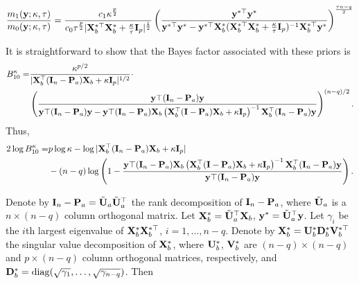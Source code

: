 \documentclass[11pt]{article}
\DeclareMathOperator{\mydiag}{diag}
\newcommand{\By}{\mathbf{y}}    \newcommand{\Bz}{\mathbf{z}}
\theoremstyle{plain}
\theoremstyle{definition}
\theoremstyle{remark}
\begin{document}
\begin{equation*}
    \begin{split}
        \frac{m_1(\By;\kappa,\tau)}{m_0(\By;\kappa,\tau)} 
        =
        \frac{c_1 \kappa^{\frac{p}{2}}}{c_0 \tau^{\frac p 2}
        |\BX_b^{*\top} \BX_b^* + \frac{\kappa}{\tau } \BI_p|^{\frac 1 2}
        }
        \left(
            \frac{\By^{*\top} \By^*}{
\By^{*\top} \By^* - \By^{*\top} \BX_b^* ( \BX_b^{*\top}\BX_b^* + \frac{\kappa}{\tau} \BI_p )^{-1} \BX_b^{*\top} \By^*
            }
        \right)^{\frac{\tau n - q }{2}}
    \end{split}
\end{equation*}


It is straightforward to show that the Bayes factor associated with these priors is
\begin{equation*}
    \begin{split}
        B_{10}^{\kappa}=  &
    \frac{\kappa^{p/2}}{
        |\BX_b^\top (\BI_n -\BP_a) \BX_b + \kappa \BI_p |^{1/2}
    }
    \cdot
    \\
    &
    \left(
        \frac{
            \By\top (\BI_n-\BP_a) \By
        }{
            \By\top (\BI_n-\BP_a) \By
            -
            \By\top (\BI_n-\BP_a) \BX_b
            \left(\BX_b^\top  (\BI-\BP_a) \BX_b + \kappa \BI_p\right)^{-1}
            \BX_b^\top (\BI_n-\BP_a) \By
        }
    \right)^{(n-q)/2}.
    \end{split}
\end{equation*}
Thus,
\begin{equation*}
    \begin{split}
        2\log B_{10}^{\kappa} =  &
    p\log \kappa
    -
        \log |\BX_b^\top (\BI_n -\BP_a) \BX_b + \kappa \BI_p |
    \\
    &
    -(n-q)\log \left(
            1-
        \frac{
            \By\top (\BI_n-\BP_a) \BX_b
            \left(\BX_b^\top  (\BI-\BP_a) \BX_b + \kappa \BI_p\right)^{-1}
            \BX_b^\top (\BI_n-\BP_a) \By
        }{
            \By\top (\BI_n-\BP_a) \By
        }
    \right).
    \end{split}
\end{equation*}

Denote by $\mathbf{I}_n-\mathbf{P}_a=\tilde{\mathbf{U}}_a \tilde{\mathbf{U}}_a^\top$ the rank decomposition of $\mathbf{I}_n - \mathbf{P}_a$, where $\tilde{\mathbf{U}}_a$ is a $n\times (n-q)$ column orthogonal matrix.
Let $\mathbf{X}_b^* = \tilde{\mathbf{U}}_a^\top \mathbf{X}_b$, $\By^* =\tilde \BU_a^\top \By$.
Let $\gamma_i$ be the $i$th largest eigenvalue of $\mathbf{X}^*_b \mathbf{X}_b^{*\top}$, $i=1,\ldots, n-q$.
Denote by $\mathbf{X}_b^* =\mathbf{U}_{b}^* \mathbf{D}_{b}^* \mathbf{V}_b^{*\top}$ the singular value decomposition of $\mathbf{X}_{b}^*$, where  $\mathbf{U}_{b}^*$, $\mathbf{V}_b^*$ are $(n-q)\times (n-q)$ and $p\times (n-q)$ column orthogonal matrices, respectively, and $\BD_{b}^*=\mydiag (\sqrt {\gamma_1},\ldots, \sqrt{\gamma_{n-q}})$.
Then
\end{document}
